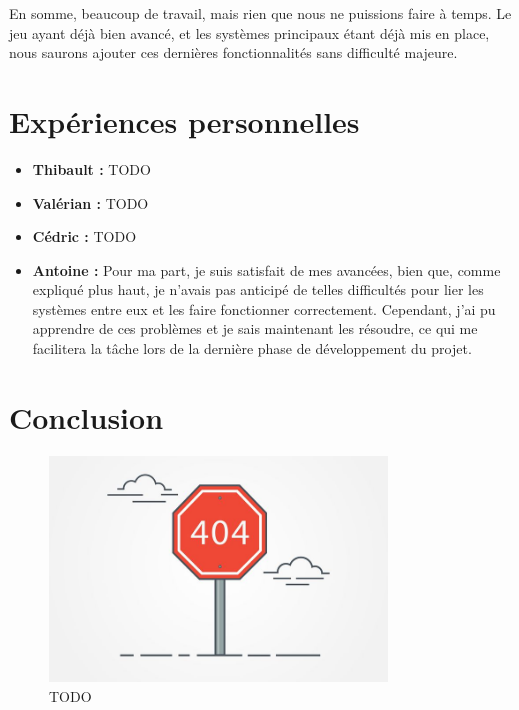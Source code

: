 \documentclass[12pt]{report}
\begin{document}
En somme, beaucoup de travail, mais rien que nous ne puissions faire à temps. Le jeu ayant déjà bien avancé, et les systèmes principaux étant déjà mis en place, nous saurons ajouter ces dernières fonctionnalités sans difficulté majeure.

\chapter{Expériences personnelles}

\begin{itemize}
	\item \textbf{Thibault :} TODO
        \item \textbf{Valérian :} TODO
	\item \textbf{Cédric :} TODO
	\item \textbf{Antoine :} Pour ma part, je suis satisfait de mes avancées, bien que, comme expliqué plus haut, je n'avais pas anticipé de telles difficultés pour lier les systèmes entre eux et les faire fonctionner correctement. Cependant, j'ai pu apprendre de ces problèmes et je sais maintenant les résoudre, ce qui me facilitera la tâche lors de la dernière phase de développement du projet.
\end{itemize}

\chapter{Conclusion}

\begin{figure}[H]
    \centering
    \includegraphics[width=0.8\textwidth]{404}
    \caption{TODO}
\end{figure}
\end{document}
